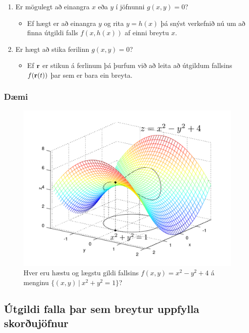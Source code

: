 \begin {enumerate}
 \item Er mögulegt að einangra $x$ eða $y$ í jöfnunni $g(x,y)=0$?  
 
 \medskip
 \begin {itemize}
  \item [] Ef hægt er að einangra $y$ og rita $y=h(x)$ þá snýst verkefnið nú um að finna útgildi falls $f(x,h(x))$ af einni breytu $x$.

 \end {itemize}
 \item  Er hægt að stika ferilinn $g(x,y)=0$?  
 
 \begin {itemize}
  \item [] Ef $\mbox{${\bf r}$}$ er stikun á
     ferlinum þá þurfum við að leita að útgildum fallsins $f(\mbox{${\bf r}$}(t))$ þar sem
     er bara ein breyta.  
 \end {itemize}

\end {enumerate}








\subsubsection{Dæmi}
 \begin {figure}[h!]
 \centering
            \includegraphics[width=.7\linewidth]{constraint.pdf}
            \caption*{Hver eru hæstu og lægstu gildi fallsins $f(x,y) = x^2-y^2+4$ á menginu $\{(x,y)~|~x^2+y^2=1\}$?}
\end {figure}




 


\subsection{Útgildi falla þar sem breytur uppfylla skorðujöfnur} 

